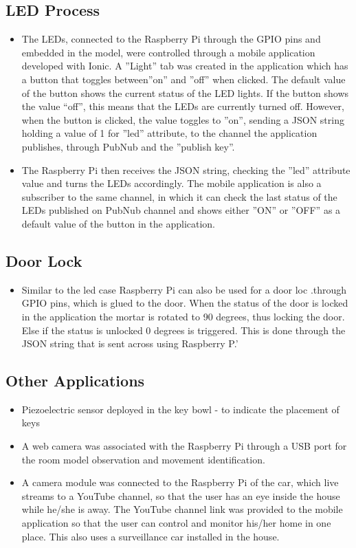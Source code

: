 \documentclass[12pt, letterpaper]{article}
\begin{document}
\subsection{LED Process}
\begin{itemize}
\item The LEDs, connected to the Raspberry Pi through the GPIO pins and embedded in the model, were controlled through a mobile application developed with Ionic. A ”Light” tab was created in the application which has a button that toggles between”on” and ”off” when clicked. The default value of the button shows the current status of the LED lights. If the button shows the value “off”, this means that the LEDs are currently turned off. However, when the button is clicked, the value toggles to ”on”, sending a JSON string holding a value of 1 for ”led” attribute, to the channel the application publishes, through PubNub and the ”publish key”.
\item The Raspberry Pi then receives the JSON string, checking the ”led” attribute value and turns the LEDs accordingly. The mobile application is also a subscriber to the same channel, in which it can check the last status of the LEDs published on PubNub channel and shows either ”ON” or ”OFF” as a default value of the button in the application.
\end{itemize}

\subsection{Door Lock}
\begin{itemize}
\item Similar to the led case Raspberry Pi can also be used for a door loc
.through GPIO pins, which is glued to the door. When the status of the door
is locked in the application the mortar is rotated to 90 degrees, thus
locking the door. Else if the status is unlocked 0 degrees is triggered.
This is done through the JSON string that is sent across using Raspberry P.’
\end{itemize}

\subsection{Other Applications}
\begin{itemize}
\item Piezoelectric sensor deployed in the key bowl - to indicate the placement of keys
\item A web camera was associated with the Raspberry Pi through a USB port for the room model observation and movement identification.
\item A camera module was connected to the Raspberry Pi of the car, which live streams to a YouTube channel, so that the user has an eye inside the house while he/she is away. The YouTube channel link was provided to the mobile application so that the user can control and monitor his/her home in one place. This also uses a surveillance car installed in the house.
\end{itemize}
\end{document}

